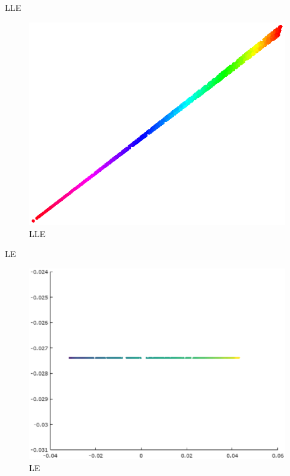 \documentclass{beamer}
\begin{document}
\begin{darkframes}
   \begin{frame}{LLE}
   \begin{figure}
   \centering
   \includegraphics[scale=0.5]{./figs/lle2.eps}
   \caption{LLE}
   \end{figure}
   \end{frame}
   
   
   \begin{frame}{LE}
   \begin{figure}
   \centering
   \includegraphics[scale=0.4]{./figs/LE.eps}
   \caption{LE}
   \end{figure}
   \end{frame}
   

\end{darkframes}
\end{document}
